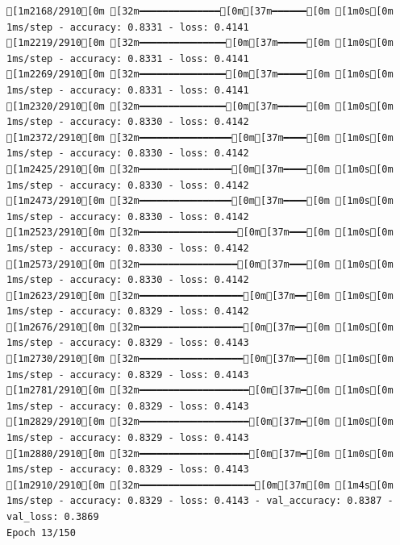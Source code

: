\documentclass[
  letterpaper,
  DIV=11,
  numbers=noendperiod]{scrartcl}
\begin{document}
\begin{verbatim}
[1m2168/2910[0m [32m━━━━━━━━━━━━━━[0m[37m━━━━━━[0m [1m0s[0m 1ms/step - accuracy: 0.8331 - loss: 0.4141
[1m2219/2910[0m [32m━━━━━━━━━━━━━━━[0m[37m━━━━━[0m [1m0s[0m 1ms/step - accuracy: 0.8331 - loss: 0.4141
[1m2269/2910[0m [32m━━━━━━━━━━━━━━━[0m[37m━━━━━[0m [1m0s[0m 1ms/step - accuracy: 0.8331 - loss: 0.4141
[1m2320/2910[0m [32m━━━━━━━━━━━━━━━[0m[37m━━━━━[0m [1m0s[0m 1ms/step - accuracy: 0.8330 - loss: 0.4142
[1m2372/2910[0m [32m━━━━━━━━━━━━━━━━[0m[37m━━━━[0m [1m0s[0m 1ms/step - accuracy: 0.8330 - loss: 0.4142
[1m2425/2910[0m [32m━━━━━━━━━━━━━━━━[0m[37m━━━━[0m [1m0s[0m 1ms/step - accuracy: 0.8330 - loss: 0.4142
[1m2473/2910[0m [32m━━━━━━━━━━━━━━━━[0m[37m━━━━[0m [1m0s[0m 1ms/step - accuracy: 0.8330 - loss: 0.4142
[1m2523/2910[0m [32m━━━━━━━━━━━━━━━━━[0m[37m━━━[0m [1m0s[0m 1ms/step - accuracy: 0.8330 - loss: 0.4142
[1m2573/2910[0m [32m━━━━━━━━━━━━━━━━━[0m[37m━━━[0m [1m0s[0m 1ms/step - accuracy: 0.8330 - loss: 0.4142
[1m2623/2910[0m [32m━━━━━━━━━━━━━━━━━━[0m[37m━━[0m [1m0s[0m 1ms/step - accuracy: 0.8329 - loss: 0.4142
[1m2676/2910[0m [32m━━━━━━━━━━━━━━━━━━[0m[37m━━[0m [1m0s[0m 1ms/step - accuracy: 0.8329 - loss: 0.4143
[1m2730/2910[0m [32m━━━━━━━━━━━━━━━━━━[0m[37m━━[0m [1m0s[0m 1ms/step - accuracy: 0.8329 - loss: 0.4143
[1m2781/2910[0m [32m━━━━━━━━━━━━━━━━━━━[0m[37m━[0m [1m0s[0m 1ms/step - accuracy: 0.8329 - loss: 0.4143
[1m2829/2910[0m [32m━━━━━━━━━━━━━━━━━━━[0m[37m━[0m [1m0s[0m 1ms/step - accuracy: 0.8329 - loss: 0.4143
[1m2880/2910[0m [32m━━━━━━━━━━━━━━━━━━━[0m[37m━[0m [1m0s[0m 1ms/step - accuracy: 0.8329 - loss: 0.4143
[1m2910/2910[0m [32m━━━━━━━━━━━━━━━━━━━━[0m[37m[0m [1m4s[0m 1ms/step - accuracy: 0.8329 - loss: 0.4143 - val_accuracy: 0.8387 - val_loss: 0.3869
Epoch 13/150


\end{verbatim}
\end{document}
